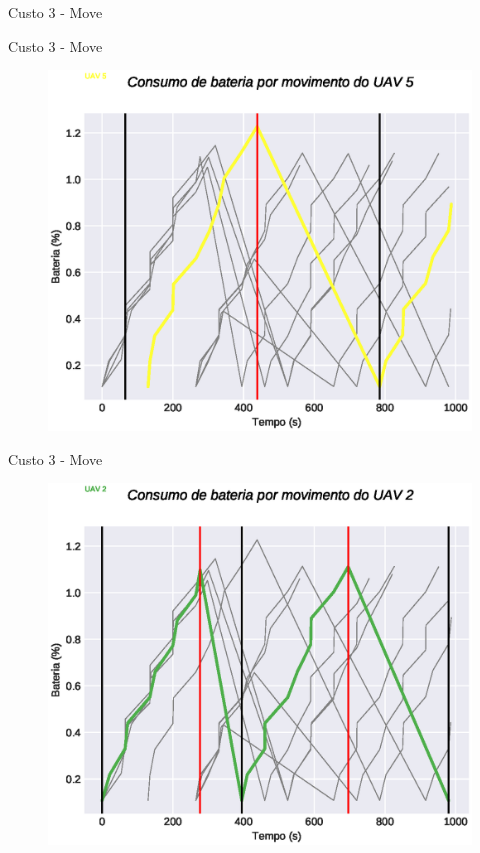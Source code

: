 \begin{frame}{Custo 3 - Move}
\begin{figure}[!htb]
                 \end{figure}
            \end{frame}\begin{frame}{Custo 3 - Move}
                \begin{figure}[!htb]
                     \includegraphics[width=\textwidth]{custo_3/uav_move_acum_uav_5.eps}
                 \end{figure}
            \end{frame}\begin{frame}{Custo 3 - Move}
                \begin{figure}[!htb]
                     \includegraphics[width=\textwidth]{custo_3/uav_move_acum_uav_2.eps}

\end{figure}
\end{frame}
